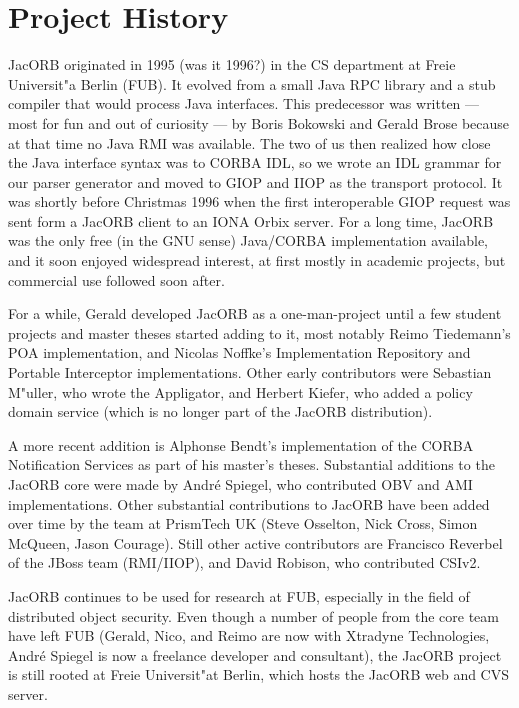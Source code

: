 \section{Project History}

JacORB originated in 1995 (was it 1996?) in the CS department at Freie
Universit"a Berlin (FUB). It evolved from a small Java RPC library and a
stub compiler that would process Java interfaces. This predecessor was
written --- most for fun and out of curiosity --- by Boris Bokowski
and Gerald Brose because at that time no Java RMI was available. The
two of us then realized how close the Java interface syntax was to
CORBA IDL, so we wrote an IDL grammar for our parser generator and
moved to GIOP and IIOP as the transport protocol. It was shortly
before Christmas 1996 when the first interoperable GIOP request was
sent form a JacORB client to an IONA Orbix server. For a long time,
JacORB was the only free (in the GNU sense) Java/CORBA implementation
available, and it soon enjoyed widespread interest, at first mostly in
academic projects, but commercial use followed soon after.

For a while, Gerald developed JacORB as a one-man-project until a few
student projects and master theses started adding to it, most notably
Reimo Tiedemann's POA implementation, and Nicolas Noffke's
Implementation Repository and Portable Interceptor implementations.
Other early contributors were Sebastian M"uller, who wrote the
Appligator, and Herbert Kiefer, who added a policy domain service
(which is no longer part of the JacORB distribution). 

A more recent addition is Alphonse Bendt's implementation of the CORBA
Notification Services as part of his master's theses. Substantial
additions to the JacORB core were made by Andr{\'e} Spiegel, who
contributed OBV and AMI implementations. Other substantial
contributions to JacORB have been added over time by the team at
PrismTech UK (Steve Osselton, Nick Cross, Simon McQueen, Jason
Courage). Still other active contributors are Francisco Reverbel of
the JBoss team (RMI/IIOP), and David Robison, who contributed CSIv2.

JacORB continues to be used for research at FUB, especially in the
field of distributed object security. Even though a number of people
from the core team have left FUB (Gerald, Nico, and Reimo are now with
Xtradyne Technologies, Andr{\'e} Spiegel is now a freelance developer and
consultant), the JacORB project is still rooted at Freie
Universit"at Berlin, which hosts the JacORB web and CVS server.

